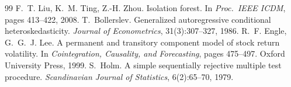 \documentclass[11pt]{article}
\begin{document}
\begin{thebibliography}{99}
 F.~T. Liu, K.~M. Ting, Z.-H. Zhou. Isolation forest. In \emph{Proc.\ IEEE ICDM}, pages 413--422, 2008.
 T.~Bollerslev. Generalized autoregressive conditional heteroskedasticity. \emph{Journal of Econometrics}, 31(3):307--327, 1986.
 R.~F. Engle, G.~G.~J. Lee. A permanent and transitory component model of stock return volatility. In \emph{Cointegration, Causality, and Forecasting}, pages 475--497. Oxford University Press, 1999.
 S.~Holm. A simple sequentially rejective multiple test procedure. \emph{Scandinavian Journal of Statistics}, 6(2):65--70, 1979.
\end{thebibliography}
\end{document}
